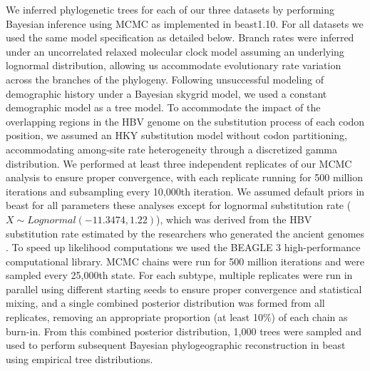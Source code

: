 We inferred phylogenetic trees for each of our three datasets by performing Bayesian inference using MCMC as implemented in \gls{beast}1.10. %
For all datasets we used the same model specification as detailed below.
Branch rates were inferred under an uncorrelated relaxed molecular clock model assuming an underlying lognormal distribution, allowing us accommodate evolutionary rate variation across the branches of the phylogeny.
Following unsuccessful modeling of demographic history under a Bayesian skygrid model, we used a constant demographic model as a tree model. %
To accommodate the impact of the overlapping regions in the HBV genome on the substitution process of each codon position, we assumed an HKY substitution model without codon partitioning, accommodating among-site rate heterogeneity through a discretized gamma distribution. %
We performed at least three independent replicates of our MCMC analysis to ensure proper convergence, with each replicate running for 500 million iterations and subsampling every 10,000th iteration. %
We assumed default priors in \gls{beast} for all parameters these analyses except for lognormal substitution rate ($X \sim Lognormal(-11.3474,1.22)$), %
which was derived from the HBV substitution rate estimated by the researchers who generated the ancient genomes \cite{muhlemann}.
To speed up likelihood computations we used the BEAGLE 3 high-performance computational library.
MCMC chains were run for 500 million iterations and were sampled every 25,000th state.
For each subtype, multiple replicates were run in parallel using different starting seeds to ensure proper convergence and statistical mixing, and a single combined posterior distribution was formed from all replicates, removing an appropriate proportion (at least 10\%) of each chain as burn-in.
From this combined posterior distribution, 1,000 trees were sampled and used to perform subsequent Bayesian phylogeographic reconstruction in \gls{beast} using empirical tree distributions. %

